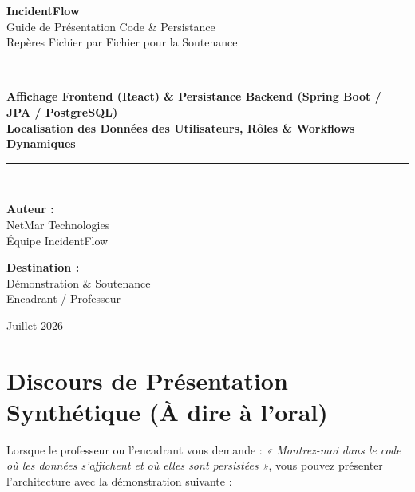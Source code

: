 \documentclass[11pt,a4paper]{article}
\begin{document}
\begin{titlepage}
    \centering
    \vspace*{1.5cm}
    
    {\Huge \bfseries \color{navyprimary} IncidentFlow}\\[0.4cm]
    {\LARGE \color{blueaccent} Guide de Présentation Code \& Persistance}\\[0.2cm]
    {\large \color{slategray} Repères Fichier par Fichier pour la Soutenance}\\[1.5cm]
    
    \rule{\linewidth}{0.5mm}\\[0.6cm]
    {\Large \bfseries Affichage Frontend (React) \& Persistance Backend (Spring Boot / JPA / PostgreSQL)}\\[0.3cm]
    {\large \textbf{Localisation des Données des Utilisateurs, Rôles \& Workflows Dynamiques}}\\[0.6cm]
    \rule{\linewidth}{0.5mm}\\[2cm]
    
    \begin{minipage}{0.45\textwidth}
        \begin{flushleft} \large
            \textbf{Auteur :}\\
            NetMar Technologies\\
            Équipe IncidentFlow
        \end{flushleft}
    \end{minipage}
    \begin{minipage}{0.45\textwidth}
        \begin{flushright} \large
            \textbf{Destination :}\\
            Démonstration \& Soutenance\\
            Encadrant / Professeur
        \end{flushright}
    \end{minipage}

    \vfill
    {\large Juillet 2026}
\end{titlepage}

\tableofcontents
\newpage

\section{Discours de Présentation Synthétique (À dire à l'oral)}

Lorsque le professeur ou l'encadrant vous demande : \textit{« Montrez-moi dans le code où les données s'affichent et où elles sont persistées »}, vous pouvez présenter l'architecture avec la démonstration suivante :
\end{document}
